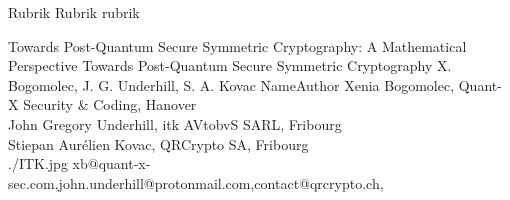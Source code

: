\documentclass[a4paper,11pt]{article}
\begin{document}
\setcounter{footnote}{0}
\setcounter{figure}{0}


\Abschnitt
{Rubrik}
{Rubrik}
{rubrik}

\vspace{3mm}


\Aufsatz 
{Towards Post-Quantum Secure Symmetric Cryptography: A Mathematical Perspective}
{Towards Post-Quantum Secure Symmetric Cryptography}
{X. Bogomolec, J. G. Underhill, S. A. Kovac}
{NameAuthor}
{ Xenia Bogomolec, Quant-X Security {\&} Coding, Hanover\\ John Gregory Underhill, itk AVtobvS SARL, Fribourg\\  Stiepan Aurélien Kovac, QRCrypto SA, Fribourg \\}
{./ITK.jpg}
{xb@quant-x-sec.com,john.underhill@protonmail.com,contact@qrcrypto.ch,}
\end{document}
